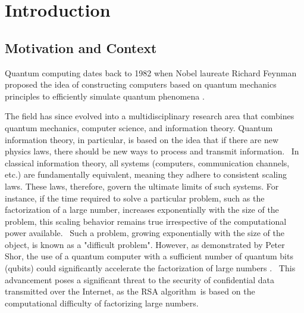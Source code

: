 \chapter{Introduction}



\section{Motivation and Context}


Quantum computing dates back to 1982 when Nobel laureate Richard Feynman proposed the idea of constructing computers based on quantum mechanics principles to efficiently simulate quantum phenomena \cite{feynman2018simulating}. 

The field has since evolved into a multidisciplinary research area that combines quantum mechanics, computer science, and information theory. Quantum information theory, in particular, is based on the idea that if there are new physics laws, there should be new ways to process and transmit information.  In classical information theory, all systems (computers, communication channels, etc.) are fundamentally equivalent, meaning they adhere to consistent scaling laws. These laws, therefore, govern the ultimate limits of such systems. For instance, if the time required to solve a particular problem, such as the factorization of a large number, increases exponentially with the size of the problem, this scaling behavior remains true irrespective of the computational power available.  Such a problem, growing exponentially with the size of the object, is known as a "difficult problem". However, as demonstrated by Peter Shor, the use of a quantum computer with a sufficient number of quantum bits (qubits) could significantly accelerate the factorization of large numbers \cite{shor1994algorithms}.  This advancement poses a significant threat to the security of confidential data transmitted over the Internet, as the RSA algorithm is based on the computational difficulty of factorizing large numbers.

